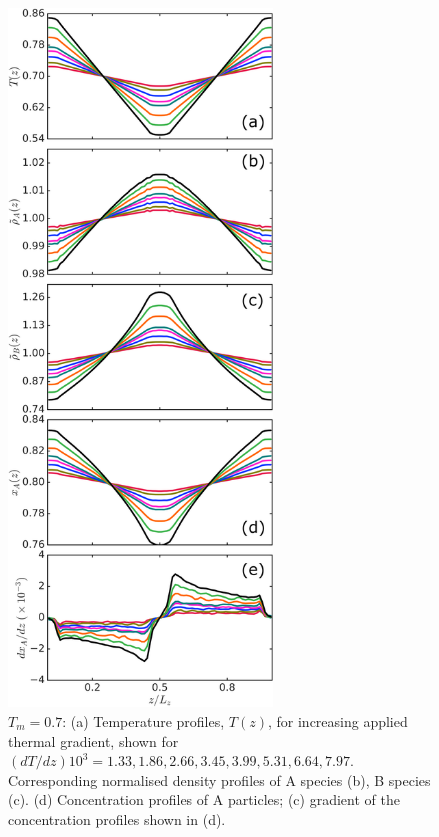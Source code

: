 %
\begin{figure}[hbt!]
    \centering
	\includegraphics[width=7cm]{figs/fig3p6.png}
	\caption[{\em Varying gradient strength at $T_m=0.7$, to observe linear and nonlinear response}]{$T_m=0.7$: (a) Temperature profiles, $T(z)$, for increasing applied thermal gradient, shown for $(dT/dz)10^3=1.33, 1.86, 2.66, 3.45, 3.99, 5.31, 6.64, 7.97$. Corresponding normalised density profiles of A species (b), B species (c). (d) Concentration profiles of A particles; (c) gradient of the concentration profiles shown in (d). \label{fig3p6}}
\end{figure}


